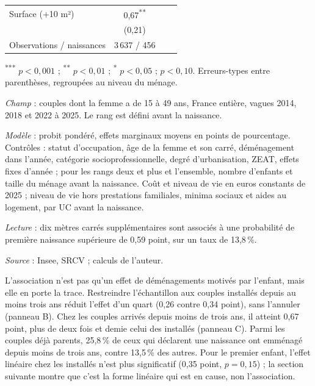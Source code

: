 \documentclass[11pt,a4paper]{article}
\theoremstyle{plain}
\theoremstyle{definition}
\theoremstyle{remark}
\newcommand{\sym}[1]{\textsuperscript{#1}}
\begin{document}
\begin{table}[htbp]
\begin{threeparttable}
\begin{tabular}{@{}lccc@{}}
Surface (+10 m²)                 & 0,67\sym{**} & & \\
                                 & (0,21) & & \\
Observations / naissances        & 3\,637 / 456 & & \\
\bottomrule
\end{tabular}
\begin{tablenotes}\scriptsize
\item \sym{***} $p<0{,}001$ ; \sym{**} $p<0{,}01$ ; \sym{*} $p<0{,}05$ ; \sym{\dag} $p<0{,}10$. Erreurs-types entre parenthèses, regroupées au niveau du ménage.
\item \textit{Champ} : couples dont la femme a de 15 à 49 ans, France entière, vagues 2014, 2018 et 2022 à 2025. Le rang est défini avant la naissance.
\item \textit{Modèle} : probit pondéré, effets marginaux moyens en points de pourcentage. Contrôles : statut d'occupation, âge de la femme et son carré, déménagement dans l'année, catégorie socioprofessionnelle, degré d'urbanisation, ZEAT, effets fixes d'année ; pour les rangs deux et plus et l'ensemble, nombre d'enfants et taille du ménage avant la naissance. Coût et niveau de vie en euros constants de 2025 ; niveau de vie hors prestations familiales, minima sociaux et aides au logement, par UC avant la naissance.
\item \textit{Lecture} : dix mètres carrés supplémentaires sont associés à une probabilité de première naissance supérieure de 0,59 point, sur un taux de 13,8\,\%.
\item \textit{Source} : Insee, SRCV ; calculs de l'auteur.
\end{tablenotes}
\end{threeparttable}
\end{table}

L'association n'est pas qu'un effet de déménagements motivés par l'enfant, mais elle en porte la trace. Restreindre l'échantillon aux couples installés depuis au moins trois ans réduit l'effet d'un quart (0,26 contre 0,34 point), sans l'annuler (panneau B). Chez les couples arrivés depuis moins de trois ans, il atteint 0,67 point, plus de deux fois et demie celui des installés (panneau C). Parmi les couples déjà parents, 25,8\,\% de ceux qui déclarent une naissance ont emménagé depuis moins de trois ans, contre 13,5\,\% des autres. Pour le premier enfant, l'effet linéaire chez les installés n'est plus significatif (0,35 point, $p = 0{,}15$) ; la section suivante montre que c'est la forme linéaire qui est en cause, non l'association.
\end{document}
